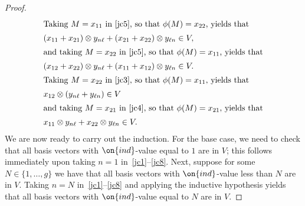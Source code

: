 \begin{proof}
\begin{align}
\intertext{Taking $M = x_{11}$ in~\eqref{jc5}, so that $\phi(M) = x_{22}$, yields that}
	& (x_{11} + x_{21}) \otimes y_{n \ell} + (x_{21} + x_{22}) \otimes y_{\ell n} \in V, \label{jc6} \\
    \intertext{and taking $M = x_{22}$ in~\eqref{jc5}, so that $\phi(M) = x_{11}$, yields that}
	& (x_{12} + x_{22}) \otimes y_{n\ell} + (x_{11} + x_{12}) \otimes y_{\ell n} \in V. \label{jc7} \\
\intertext{Taking $M = x_{22}$ in~\eqref{jc3}, so that $\phi(M) = x_{11}$, yields that}
& x_{12} \otimes (y_{n \ell} + y_{\ell n}) \in V \label{jc4} \\
\intertext{and taking $M = x_{21}$ in~\eqref{jc4}, so that $\phi(M) = x_{21}$, yields that}
&  x_{11} \otimes y_{n \ell} + x_{22} \otimes y_{\ell n} \in V. \label{jc8}
\end{align}
We are now ready to carry out the induction. For the base case, we need to check that all basis vectors with $\on{ind}$-value equal to $1$ are in $V$; this follows immediately upon taking $n = 1$ in~\eqref{jc1}--\eqref{jc8}. Next, suppose for some $N \in \{1, \dots, g\}$ we have that all basis vectors with $\on{ind}$-value less than $N$ are in $V$. Taking $n = N$ in~\eqref{jc1}--\eqref{jc8} and applying the inductive hypothesis yields that all basis vectors with $\on{ind}$-value equal to $N$ are in $V$.
\begin{comment}    
	Since $x_{12} \otimes y_{kk} \in V$, we also have $x_{21} \otimes y_{kk} \in V$. 
	
	By the inductive hypothesis, $V$ contains 
	\[
	x_{12}M \otimes y_{(k-1)\ell} + \phi(M) x_{12} \otimes y_{\ell(k-1)}, 
	\]
	so we conclude that 
	\[
	x_{12}M \otimes y_{k \ell} + \phi(M) x_{12} \otimes y_{\ell k} \in V. 
	\]
	
	
	Since we already know that $x_{11} \otimes y_{k \ell} + x_{22} \otimes y_{\ell k} \in V$, we conclude that 
	\[
	x_{21} \otimes y_{k \ell} + x_{21} \otimes y_{\ell k} \in V. 
	\]

	Since we already know that $x_{12} \otimes y_{k \ell} +  x_{12} \otimes y_{\ell k} \in V$, we conclude that 
	\[
	x_{22} \otimes y_{k \ell} + x_{11} \otimes y_{\ell k} \in V. 
	\]
	Examining the boxed statements shows that we have proven the inductive step.
\end{comment}
\end{proof}

	
